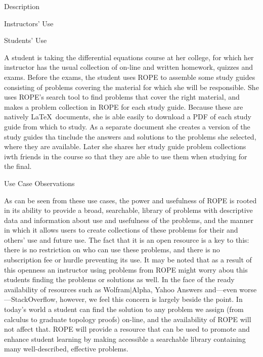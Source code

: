 \documentclass[11pt]{article}
\begin{document}
\begin{section}{Description}
\begin{subsection}{Instructors' Use}
\end{subsection}

\begin{subsection}{Students' Use}

A student is taking the differential equations course at her college, for
which her instructor has the usual collection of on-line and written
homework, quizzes and exams.  Before the exams, the student uses ROPE to
assemble some study guides consisting of problems covering the material
for which she will be responsible.  She uses ROPE's search tool to find
problems that cover the right material, and makes a problem collection in
ROPE for each study guide.  Because these are natively \LaTeX\ documents,
she is able easily to download a PDF of each study guide from which to
study.  As a separate document she creates a version of the study guides
tha tinclude the answers and solutions to the problems she selected, where
they are available.  Later she shares her study guide problem collections
iwth friends in the course so that they are able to use them when studying
for the final.

\end{subsection}

\begin{subsection}{Use Case Observations}

As can be seen from these use cases, the power and usefulness of ROPE is
rooted in its ability to provide a broad, searchable, library of problems
with descriptive data and information about use and usefulness of the
problems, and the manner in which it allows users to create collections of
these problems for their and others' use and future use.  The fact that it
is an open resource is a key to this: there is no restriction on who can
use these problems, and there is no subscription fee or hurdle preventing
its use.  It may be noted that as a result of this openness an instructor
using problems from ROPE might worry abou this students finding the
problems or solutions as well.  In the face of the ready availability of
resources such as Wolfram$|$Alpha, Yahoo Answers and---even
worse---StackOverflow, however, we feel this concern is largely beside the
point.  In today's world a student can find the solution to any problem we
assign (from calculus to graduate topology proofs) on-line, and the
availability of ROPE will not affect that.  ROPE will provide a resource
that can be used to promote and enhance student learning by making
accessible a searchable library containing many well-described, effective
problems.

\end{subsection}

\end{section}
\end{document}
